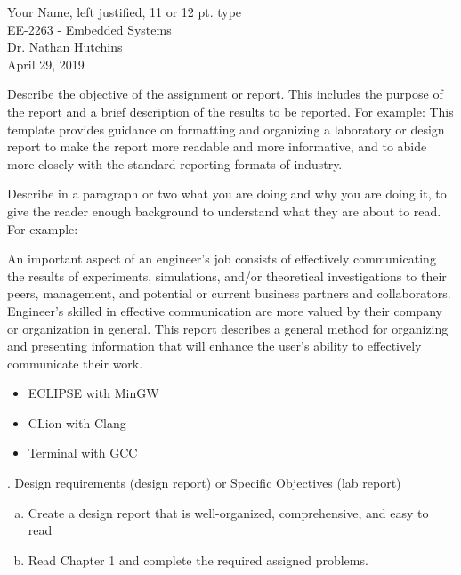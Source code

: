 \documentclass[11pt]{ECEtemp}
\newcommand{\assignment}{Title (Chapter One Homework)}
\newcommand{\subdate}{April 29, 2019}
\newcommand{\class}{EE-2263  -  Embedded Systems}
\newcommand{\Name}{Your Name, left justified, 11 or 12 pt. type}
\newcommand{\prof}{Dr. Nathan Hutchins}
\begin{document}
\noindent
\Name \\ \class \\ \prof \\ \subdate 
\eceTitle{\assignment}

Describe the objective of the assignment or report. This includes the purpose of the report and a brief description of the results to be reported. For example: This template provides guidance on formatting and organizing a laboratory or design report to make the report more readable and more informative, and to abide more closely with the standard reporting formats of industry.

Describe in a paragraph or two what you are doing and why you are doing it, to give the reader enough background to understand what they are about to read.  For example:

An important aspect of an engineer’s job consists of effectively communicating the results of experiments, simulations, and/or theoretical investigations to their peers, management, and potential or current business partners and collaborators. Engineer’s skilled in effective communication are more valued by their company or organization in general. This report describes a general method for organizing and presenting information that will enhance the user’s ability to effectively communicate their work.

\begin{itemize}
\itemsep0em %
\item   ECLIPSE with MinGW
\item   CLion with Clang
\item   Terminal with GCC
\end{itemize}

. Design requirements (design report) or Specific Objectives (lab report)
\begin{enumerate}[(a)]
    \itemsep0em %
    \item Create a design report that is well-organized, comprehensive, and easy to read
    \item Read Chapter 1 and complete the required assigned problems.
\end{enumerate}
\end{document}
